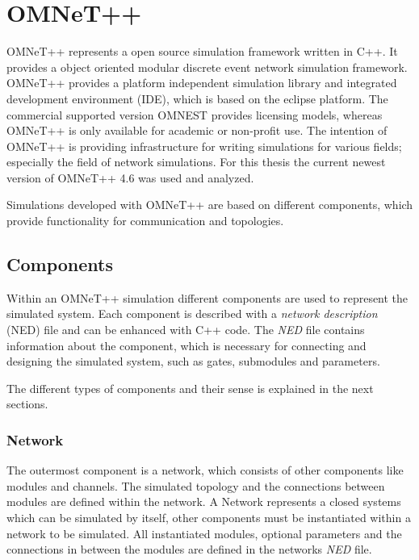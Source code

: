 \chapter{OMNeT++}
\label{cha:omnet}

OMNeT++ represents a open source simulation framework written in C++.
It provides a object oriented modular discrete event network simulation framework.
OMNeT++ provides a platform independent simulation library and integrated development environment (IDE), which is based on the eclipse platform.
The commercial supported version OMNEST provides licensing models, whereas OMNeT++ is only available for academic or non-profit use.
The intention of OMNeT++ is providing infrastructure for writing simulations for various fields; especially the field of network simulations.
For this thesis the current newest version of OMNeT++ 4.6 was used and analyzed.

Simulations developed with OMNeT++ are based on different components, which provide functionality for communication and topologies.

\section{Components}
\label{sec:omnet_components}
Within an OMNeT++ simulation different components are used to represent the simulated system.
Each component is described with a \emph{network description} (NED) file and can be enhanced with C++ code.
The \emph{NED} file contains information about the component, which is necessary for connecting and designing the simulated system, such as gates, submodules and parameters.

The different types of components and their sense is explained in the next sections.

\subsection{Network}
\label{sec:omnet_components_network}
The outermost component is a network, which consists of other components like modules and channels.
The simulated topology and the connections between modules are defined within the network.
A Network represents a closed systems which can be simulated by itself, other components must be instantiated within a network to be simulated.
All instantiated modules, optional parameters and the connections in between the modules are defined in the networks \emph{NED} file. \cite[section 3.2.1]{omnet_manual}

